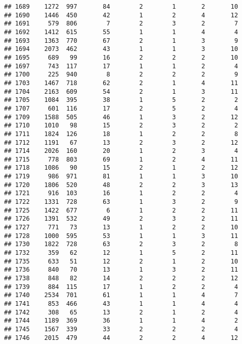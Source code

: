 \documentclass[]{article}
\begin{document}
\begin{verbatim}
## 1689    1272  997       84        2        1       2       10
## 1690    1446  450       42        1        2       4       12
## 1691     579  806        7        2        3       2        7
## 1692    1412  615       55        1        1       4        4
## 1693    1363  770       67        2        1       3        9
## 1694    2073  462       43        1        1       3       10
## 1695     689   99       16        2        2       2       10
## 1697     743  117       17        1        1       2        4
## 1700     225  940        8        2        2       2        9
## 1703    1467  718       62        2        1       4       11
## 1704    2163  609       54        2        1       3       11
## 1705    1084  395       38        1        5       2        2
## 1707     601  116       17        2        5       2        4
## 1709    1588  505       46        1        3       2       12
## 1710    1010   98       15        2        3       2        2
## 1711    1824  126       18        1        2       2        8
## 1712    1191   67       13        2        3       2       12
## 1714    2026  160       20        1        2       3        4
## 1715     778  803       69        1        2       4       11
## 1718    1086   90       15        2        1       2       12
## 1719     986  971       81        1        1       3       10
## 1720    1806  520       48        2        2       3       13
## 1721     916  103       16        1        2       2        4
## 1722    1331  728       63        1        3       2        9
## 1725    1422  677        6        1        2       2       11
## 1726    1391  532       49        2        3       2       11
## 1727     771   73       13        1        2       2       10
## 1728    1000  595       53        1        1       3       11
## 1730    1822  728       63        2        3       2        8
## 1732     359   62       12        1        5       2       11
## 1735     633   51       12        2        1       2       10
## 1736     840   70       13        1        3       2       11
## 1738     848   82       14        2        2       2       12
## 1739     884  115       17        1        2       2        4
## 1740    2534  701       61        1        1       4        7
## 1741     853  466       43        1        1       4        4
## 1742     308   65       13        2        1       2        4
## 1744    1189  369       36        1        1       4        2
## 1745    1567  339       33        2        2       2        4
## 1746    2015  479       44        2        2       4       12

\end{verbatim}
\end{document}
